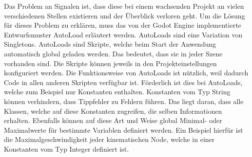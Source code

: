 
Das Problem an Signalen ist, dass diese bei einem wachsenden Projekt an vielen verschiedenen Stellen existieren und der Überblick verloren geht. Um die Lösung für dieses Problem zu erklären, muss das von der Godot Engine implementierte Entwurfsmuster AutoLoad erläutert werden\cite{godot-autoload}. AutoLoads sind eine Variation von Singletons\cite[S. 127]{design-patterns-gof}. AutoLoads sind Skripte, welche beim Start der Anwendung automatisch global geladen werden. Das bedeutet, dass sie in jeder Szene vorhanden sind. Die Skripte können jeweils in den Projekteinstellungen konfiguriert werden. Die Funktionsweise von AutoLoads ist nützlich, weil dadurch Code in allen anderen Skripten verfügbar ist. Förderlich ist dies bei AutoLoads, welche zum Beispiel nur Konstanten enthalten. Konstanten vom Typ String können verhindern, dass Tippfehler zu Fehlern führen. Das liegt daran, dass alle Klassen, welche auf diese Konstanten zugreifen, die selben Informationen erhalten. Ebenfalls können auf diese Art und Weise global Minimal- oder Maximalwerte für bestimmte Variablen definiert werden. Ein Beispiel hierfür ist die Maximalgeschwindigkeit jeder kinematischen Node, welche in einer Konstanten vom Typ Integer definiert ist.\\


